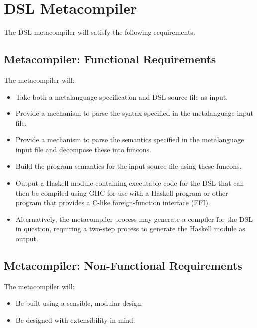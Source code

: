 \documentclass[a4paper,11pt]{report}
\begin{document}

\section{DSL Metacompiler} %
\label{sec:dsl_metacompiler}
The DSL metacompiler will satisfy the following requirements.

\subsection{Metacompiler: Functional Requirements} %
\label{sub:metacompiler_functional_requirements}
The metacompiler will:
\begin{itemize}
    \item Take both a metalanguage specification and DSL source file as input.
    \item Provide a mechanism to parse the syntax specified in the metalanguage input file.
    \item Provide a mechanism to parse the semantics specified in the metalanguage input file and decompose these into funcons.
    \item Build the program semantics for the input source file using these funcons.
    \item Output a Haskell module containing executable code for the DSL that can then be compiled using GHC for use with a Haskell program or other program that provides a C-like foreign-function interface (FFI).
    \item Alternatively, the metacompiler process may generate a compiler for the DSL in question, requiring a two-step process to generate the Haskell module as output. 
\end{itemize}


\subsection{Metacompiler: Non-Functional Requirements} %
\label{sub:metacompiler_non_functional_requirements}
The metacompiler will:
\begin{itemize}
    \item Be built using a sensible, modular design.
    \item Be designed with extensibility in mind.
\end{itemize}

\end{document}
